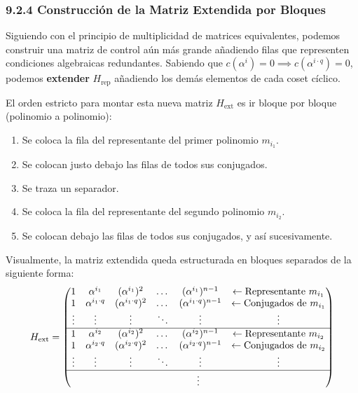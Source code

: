 \documentclass{article}
\begin{document}
\newpage
\subsubsection{9.2.4 Construcción de la Matriz Extendida por Bloques}
Siguiendo con el principio de multiplicidad de matrices equivalentes, podemos construir una matriz de control aún más grande añadiendo filas que representen condiciones algebraicas redundantes. Sabiendo que $c(\alpha^i) = 0 \implies c(\alpha^{i \cdot q}) = 0$, podemos \textbf{extender} $H_{\text{rep}}$ añadiendo los demás elementos de cada coset cíclico. 

El orden estricto para montar esta nueva matriz $H_{\text{ext}}$ es ir bloque por bloque (polinomio a polinomio):
\begin{enumerate}
    \item Se coloca la fila del representante del primer polinomio $m_{i_1}$.
    \item Se colocan justo debajo las filas de todos sus conjugados.
    \item Se traza un separador.
    \item Se coloca la fila del representante del segundo polinomio $m_{i_2}$.
    \item Se colocan debajo las filas de todos sus conjugados, y así sucesivamente.
\end{enumerate}

Visualmente, la matriz extendida queda estructurada en bloques separados de la siguiente forma:
\[
H_{\text{ext}} = \begin{pmatrix}
1 & \alpha^{i_1} & (\alpha^{i_1})^2 & \dots & (\alpha^{i_1})^{n-1} & \leftarrow \text{Representante } m_{i_1} \\
1 & \alpha^{i_1 \cdot q} & (\alpha^{i_1 \cdot q})^2 & \dots & (\alpha^{i_1 \cdot q})^{n-1} & \leftarrow \text{Conjugados de } m_{i_1} \\
\vdots & \vdots & \vdots & \ddots & \vdots & \vdots \\
\hline
1 & \alpha^{i_2} & (\alpha^{i_2})^2 & \dots & (\alpha^{i_2})^{n-1} & \leftarrow \text{Representante } m_{i_2} \\
1 & \alpha^{i_2 \cdot q} & (\alpha^{i_2 \cdot q})^2 & \dots & (\alpha^{i_2 \cdot q})^{n-1} & \leftarrow \text{Conjugados de } m_{i_2} \\
\vdots & \vdots & \vdots & \ddots & \vdots & \vdots \\
\hline
\multicolumn{6}{c}{\vdots}
\end{pmatrix}
\]
\end{document}
